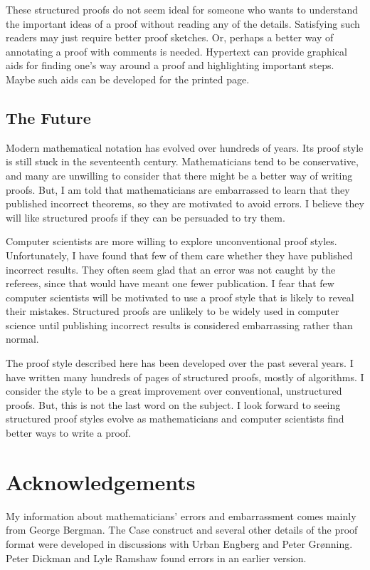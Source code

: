 These structured proofs do not seem ideal for someone who wants to
understand the important ideas of a proof without reading any of the
details.  Satisfying such readers may just require better proof
sketches.  Or, perhaps a better way of annotating a proof with
comments is needed.  Hypertext can provide graphical aids for finding
one's way around a proof and highlighting important steps.  Maybe such
aids can be developed for the printed page.
 
\subsection{The Future}

Modern mathematical notation has evolved over hundreds of years.  Its
proof style is still stuck in the seventeenth century.  Mathematicians
tend to be conservative, and many are unwilling to consider that there
might be a better way of writing proofs.  But, I am told that
mathematicians are embarrassed to learn that they published incorrect
theorems, so they are motivated to avoid errors.  I believe they will
like structured proofs if they can be persuaded to try them.

Computer scientists are more willing to explore unconventional proof
styles.  Unfortunately, I have found that few of them care whether
they have published incorrect results.  They often seem glad that an
error was not caught by the referees, since that would have meant one
fewer publication.  I fear that few computer scientists will be
motivated to use a proof style that is likely to reveal their
mistakes.  Structured proofs are unlikely to be widely used in
computer science until publishing incorrect results is considered
embarrassing rather than normal.

The proof style described here has been developed over the past
several years.  I have written many hundreds of pages of structured
proofs, mostly of algorithms.  I consider the style to be a great
improvement over conventional, unstructured proofs.  But, this is not
the last word on the subject.  I look forward to seeing structured
proof styles evolve as mathematicians and computer scientists find
better ways to write a proof.

\section*{Acknowledgements}

My information about mathematicians' errors and embarrassment comes
mainly from George Bergman.  The {\sc Case} construct and several
other details of the proof format were developed in discussions with
Urban Engberg and Peter Gr\o{}nning.  Peter Dickman and Lyle Ramshaw
found errors in an earlier version.

